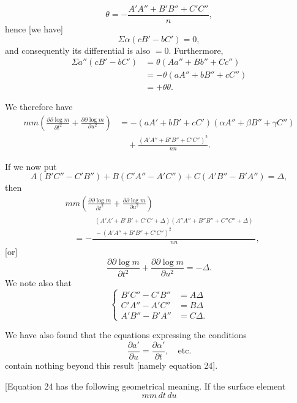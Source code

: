 %
\[
\theta=-\frac{A'A''+B'B''+C'C''}{n},
\]
hence [we have]
\[
\Sigma\alpha(cB'-bC')=0,
\]
and consequently its differential is also $=0$. Furthermore,
\[
\begin{aligned}
\Sigma a''(cB'-bC')&=\theta(Aa''+Bb''+Cc'')\\
&=-\theta(aA''+bB''+cC'')\\
&=+\theta\theta.
\end{aligned}
\]
\par\indent We therefore have
\[
\begin{aligned}
mm\left(\frac{\partial\partial\log m}{\partial t^2}+\frac{\partial\partial\log m}{\partial u^2}\right)
&=-(aA'+bB'+cC')(\alpha A''+\beta B''+\gamma C'')\\
&\quad+\frac{(A'A''+B'B''+C'C'')^2}{nn}.
\end{aligned}
\]
\par\indent If we now put
\[
A(B'C''-C'B'')+B(C'A''-A'C'')+C(A'B''-B'A'')=\Delta,
\]
then
\[
\begin{aligned}
&mm\left(\frac{\partial\partial\log m}{\partial t^2}+\frac{\partial\partial\log m}{\partial u^2}\right)\\
&\quad=-\frac{\begin{gathered}(A'A'+B'B'+C'C'+\Delta)(A''A''+B''B''+C''C''+\Delta)\\[-2pt]{}-(A'A''+B'B''+C'C'')^2\end{gathered}}{nn},
\end{aligned}
\]
[or]
\begin{equation}\tag*{[24]}
\frac{\partial\partial\log m}{\partial t^2}+\frac{\partial\partial\log m}{\partial u^2}=-\Delta.
\end{equation}
We note also that
\begin{equation}\tag*{$(\FourRingCross)$}
\left\{\begin{aligned}
B'C''-C'B''&=A\Delta\\
C'A''-A'C''&=B\Delta\\
A'B''-B'A''&=C\Delta.
\end{aligned}\right.
\end{equation}
\par\indent We have also found that the equations expressing the conditions
\[
\frac{\partial a'}{\partial u}=\frac{\partial\alpha'}{\partial t},\quad\text{etc.}
\]
contain nothing beyond this result [namely equation 24].

[Equation 24 has the following geometrical meaning. If the surface element
\[
mm\,dt\,du
\]
